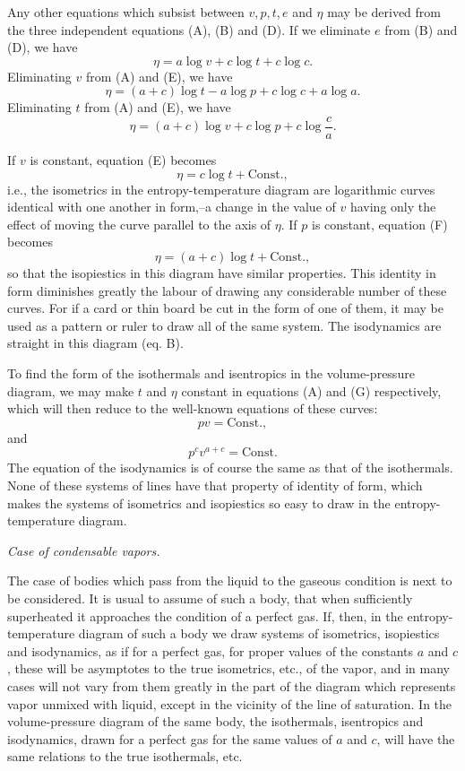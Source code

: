 \documentclass[11pt]{article}
\begin{document}
Any other equations which subsist between $v,p,t,e$ and $\eta$ may be derived from the three independent equations (A), (B) and (D). If we eliminate $e$ from (B) and (D), we have
\begin{equation}
\eta=a\log v+c\log t+c\log c. \tag{E}
\end{equation}
Eliminating $v$ from (A) and (E), we have
\begin{equation}
\eta=(a+c)\log t-a\log p+c\log c+a\log a. \tag{F}
\end{equation}
Eliminating $t$ from (A) and (E), we have
\begin{equation}
\eta=(a+c)\log v+c\log p+c\log\frac{c}{a}. \tag{G}
\end{equation}

If $v$ is constant, equation (E) becomes
\[
\eta=c\log t+\mathrm{Const.},
\]
i.e., the isometrics in the entropy-temperature diagram are logarithmic curves identical with one another in form,--a change in the value of $v$ having only the effect of moving the curve parallel to the axis of $\eta$. If $p$ is constant, equation (F) becomes
\[
\eta=(a+c)\log t+\mathrm{Const.},
\]
so that the isopiestics in this diagram have similar properties. This identity in form diminishes greatly the labour of drawing any considerable number of these curves. For if a card or thin board be cut in the form of one of them, it may be used as a pattern or ruler to draw all of the same system. The isodynamics are straight in this diagram (eq. B).

To find the form of the isothermals and isentropics in the volume-pressure diagram, we may make $t$ and $\eta$ constant in equations (A) and (G) respectively, which will then reduce to the well-known equations of these curves:
\[
pv=\mathrm{Const.},
\]
and
\[
p^c v^{a+c}=\mathrm{Const.}
\]
The equation of the isodynamics is of course the same as that of the isothermals. None of these systems of lines have that property of identity of form, which makes the systems of isometrics and isopiestics so easy to draw in the entropy-temperature diagram.

\begin{center}
\itshape Case of condensable vapors.
\end{center}

The case of bodies which pass from the liquid to the gaseous condition is next to be considered. It is usual to assume of such a body, that when sufficiently superheated it approaches the condition of a perfect gas. If, then, in the entropy-temperature diagram of such a body we draw systems of isometrics, isopiestics and isodynamics, as if for a perfect gas, for proper values of the constants $a$ and $c$, these will be asymptotes to the true isometrics, etc., of the vapor, and in many cases will not vary from them greatly in the part of the diagram which represents vapor unmixed with liquid, except in the vicinity of the line of saturation. In the volume-pressure diagram of the same body, the isothermals, isentropics and isodynamics, drawn for a perfect gas for the same values of $a$ and $c$, will have the same relations to the true isothermals, etc.
\end{document}
